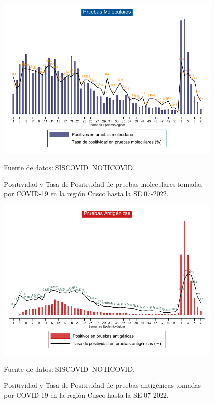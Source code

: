 \documentclass[12pt,a4paper,openany]{book}
\begin{document}
\begin{landscape}
	\begin{figure}[h]
		\caption{Positividad y Tasa de Positividad de pruebas moleculares tomadas por COVID-19 en la región Cusco hasta la SE 07-2022.}\label{fig:positividad_pcr}
		\begin{center}
			\includegraphics[width=0.90\linewidth]{../figuras/positividad_pcr.pdf}
		\end{center}
		{\footnotesize {Fuente de datos: SISCOVID, NOTICOVID.}}
	\end{figure}
\end{landscape}
\clearpage
\begin{landscape}

	\begin{figure}[h]
		\caption{ Positividad y Tasa de Positividad de pruebas antigénicas tomadas por COVID-19 en la región Cusco hasta la SE 07-2022.}\label{fig:positividad_ag}
		\begin{center}
			\includegraphics[width=0.90\linewidth]{../figuras/positividad_ag.pdf}
		\end{center}
		{\footnotesize {Fuente de datos: SISCOVID, NOTICOVID.}}
	\end{figure}
\end{landscape}
\clearpage
\end{document}
